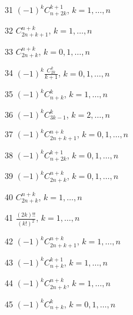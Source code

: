 \documentclass[11pt, russian]{article}
\begin{document}
31 
$(-1)^{k}C_{n+2k}^{k+1}$, $k=1,\ldots,n$\par\vspace{5mm}

32 
$C_{2n+k+1}^{n+k}$, $k=1,\ldots,n$\par\vspace{5mm}

33 
$C_{2n+k}^{n+k}$, $k=0,1,\ldots,n$\par\vspace{5mm}

34 
$(-1)^{k}\frac{C_{2k}^k}{k+1}$, $k=0,1,\ldots,n$\par\vspace{5mm}

35 
$(-1)^{k}C_{n+k}^{k}$, $k=1,\ldots,n$\par\vspace{5mm}

36 
$(-1)^{k}C_{3k-1}^{k}$, $k=2,\ldots,n$\par\vspace{5mm}

37 
$(-1)^{k}C_{2n+k+1}^{n+k}$, $k=0,1,\ldots,n$\par\vspace{5mm}

38 
$(-1)^{k}C_{n+2k}^{k+1}$, $k=0,1,\ldots,n$\par\vspace{5mm}

39 
$(-1)^{k}C_{2n+k}^{n+k}$, $k=0,1,\ldots,n$\par\vspace{5mm}

40 
$C_{2n+k}^{n+k}$, $k=1,\ldots,n$\par\vspace{5mm}

41 
$\frac{(2k)!!}{(k!)^2}$, $k=1,\ldots,n$\par\vspace{5mm}

42 
$(-1)^{k}C_{2n+k+1}^{n+k}$, $k=1,\ldots,n$\par\vspace{5mm}

43 
$(-1)^{k}C_{n+k}^{k+1}$, $k=1,\ldots,n$\par\vspace{5mm}

44 
$(-1)^{k}C_{2n+k}^{n+k}$, $k=1,\ldots,n$\par\vspace{5mm}

45 
$(-1)^{k}C_{n+k}^{k}$, $k=0,1,\ldots,n$\par\vspace{5mm}
\end{document}

